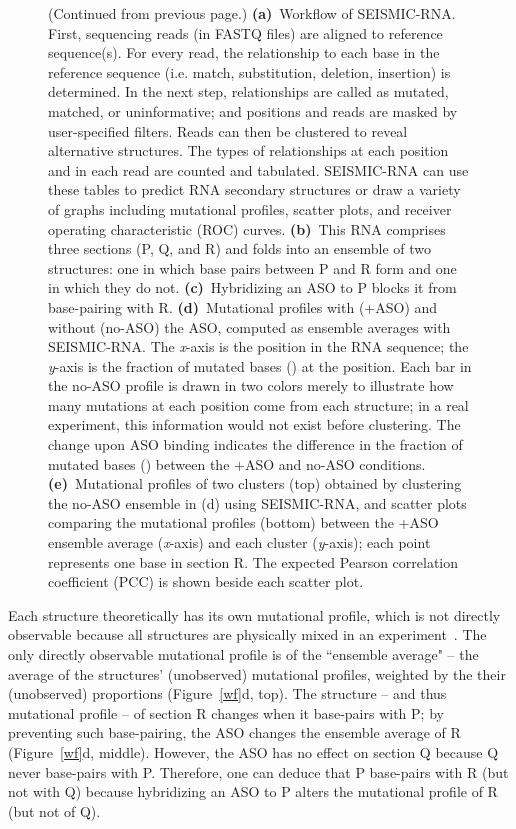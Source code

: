 \documentclass[main.tex]{subfiles}
\begin{document}
\begin{figure}[H]
	\caption[]{(Continued from previous page.) \textbf{(a)}~Workflow of SEISMIC-RNA. First, sequencing reads (in FASTQ files) are aligned to reference sequence(s). For every read, the relationship to each base in the reference sequence (i.e. match, substitution, deletion, insertion) is determined. In the next step, relationships are called as mutated, matched, or uninformative; and positions and reads are masked by user-specified filters. Reads can then be clustered to reveal alternative structures. The types of relationships at each position and in each read are counted and tabulated. SEISMIC-RNA can use these tables to predict RNA secondary structures or draw a variety of graphs including mutational profiles, scatter plots, and receiver operating characteristic (ROC) curves. \textbf{(b)}~This RNA comprises three sections (P, Q, and R) and folds into an ensemble of two structures: one in which base pairs between P and R form and one in which they do not. \textbf{(c)}~Hybridizing an ASO to P blocks it from base-pairing with R. \textbf{(d)}~Mutational profiles with (+ASO) and without (no-ASO) the ASO, computed as ensemble averages with SEISMIC-RNA. The \textit{x}-axis is the position in the RNA sequence; the \textit{y}-axis is the fraction of mutated bases (\textmu) at the position. Each bar in the no-ASO profile is drawn in two colors merely to illustrate how many mutations at each position come from each structure; in a real experiment, this information would not exist before clustering. The change upon ASO binding indicates the difference in the fraction of mutated bases (\textDelta\textmu) between the +ASO and no-ASO conditions. \textbf{(e)}~Mutational profiles of two clusters (top) obtained by clustering the no-ASO ensemble in (d) using SEISMIC-RNA, and scatter plots comparing the mutational profiles (bottom) between the +ASO ensemble average (\textit{x}-axis) and each cluster (\textit{y}-axis); each point represents one base in section R. The expected Pearson correlation coefficient (PCC) is shown beside each scatter plot.}
\end{figure}

Each structure theoretically has its own mutational profile, which is not directly observable because all structures are physically mixed in an experiment~\cite{Sherpa2015}.
The only directly observable mutational profile is of the ``ensemble average" -- the average of the structures' (unobserved) mutational profiles, weighted by the their (unobserved) proportions (Figure~\ref{wf}d, top).
The structure -- and thus mutational profile -- of section R changes when it base-pairs with P; by preventing such base-pairing, the ASO changes the ensemble average of R (Figure~\ref{wf}d, middle).
However, the ASO has no effect on section Q because Q never base-pairs with P.
Therefore, one can deduce that P base-pairs with R (but not with Q) because hybridizing an ASO to P alters the mutational profile of R (but not of Q).
\end{document}

